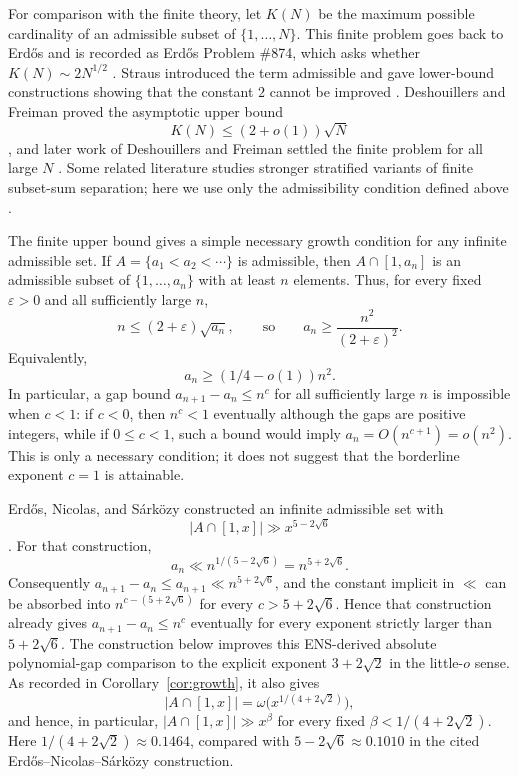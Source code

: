 \documentclass[11pt]{article}
\newcommand{\eps}{\varepsilon}
\begin{document}
For comparison with the finite theory, let $K(N)$ be the maximum possible cardinality of an admissible subset of $\{1,\ldots,N\}$.  This finite problem goes back to Erd\H{o}s and is recorded as Erd\H{o}s Problem \#874, which asks whether $K(N)\sim 2N^{1/2}$ \cite{Erdos1962,Bloom874}.  Straus introduced the term admissible and gave lower-bound constructions showing that the constant $2$ cannot be improved \cite{Straus1966}.  Deshouillers and Freiman proved the asymptotic upper bound
\[
        K(N)\le (2+o(1))\sqrt N
\]
\cite{DF1}, and later work of Deshouillers and Freiman settled the finite problem for all large $N$ \cite{DF2,Bloom874}.  Some related literature studies stronger stratified variants of finite subset-sum separation; here we use only the admissibility condition defined above \cite{Nicolas1999}.

The finite upper bound gives a simple necessary growth condition for any infinite admissible set.  If $A=\{a_1<a_2<\cdots\}$ is admissible, then $A\cap[1,a_n]$ is an admissible subset of $\{1,\ldots,a_n\}$ with at least $n$ elements.  Thus, for every fixed $\eps>0$ and all sufficiently large $n$,
\[
        n\le (2+\eps)\sqrt{a_n},
        \qquad\text{so}\qquad
        a_n\ge \frac{n^2}{(2+\eps)^2}.
\]
Equivalently,
\[
        a_n\ge (1/4-o(1))n^2.
\]
In particular, a gap bound $a_{n+1}-a_n\le n^c$ for all sufficiently large $n$ is impossible when $c<1$: if $c<0$, then $n^c<1$ eventually although the gaps are positive integers, while if $0\le c<1$, such a bound would imply $a_n=O(n^{c+1})=o(n^2)$.  This is only a necessary condition; it does not suggest that the borderline exponent $c=1$ is attainable.

Erd\H{o}s, Nicolas, and S\'ark\"ozy constructed an infinite admissible set with
\[
        |A\cap[1,x]|\gg x^{5-2\sqrt6}
\]
\cite{ENS1991}.  For that construction,
\[
        a_n\ll n^{1/(5-2\sqrt6)}=n^{5+2\sqrt6}.
\]
Consequently $a_{n+1}-a_n\le a_{n+1}\ll n^{5+2\sqrt6}$, and the constant implicit in $\ll$ can be absorbed into $n^{c-(5+2\sqrt6)}$ for every $c>5+2\sqrt6$.  Hence that construction already gives $a_{n+1}-a_n\le n^c$ eventually for every exponent strictly larger than $5+2\sqrt6$.  The construction below improves this ENS-derived absolute polynomial-gap comparison to the explicit exponent $3+2\sqrt2$ in the little-$o$ sense.  As recorded in Corollary~\ref{cor:growth}, it also gives
\[
        |A\cap[1,x]|=\omega\bigl(x^{1/(4+2\sqrt2)}\bigr),
\]
and hence, in particular, $|A\cap[1,x]|\gg x^\beta$ for every fixed $\beta<1/(4+2\sqrt2)$.  Here $1/(4+2\sqrt2)\approx0.1464$, compared with $5-2\sqrt6\approx0.1010$ in the cited Erd\H{o}s--Nicolas--S\'ark\"ozy construction.
\end{document}
